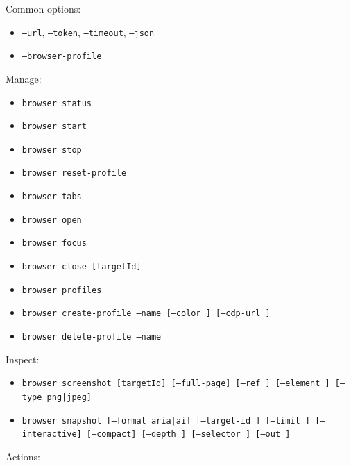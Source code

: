 Common options:

\begin{itemize}
  \item \texttt{--url}, \texttt{--token}, \texttt{--timeout}, \texttt{--json}
  \item \texttt{--browser-profile }
\end{itemize}


Manage:

\begin{itemize}
  \item \texttt{browser status}
  \item \texttt{browser start}
  \item \texttt{browser stop}
  \item \texttt{browser reset-profile}
  \item \texttt{browser tabs}
  \item \texttt{browser open }
  \item \texttt{browser focus }
  \item \texttt{browser close [targetId]}
  \item \texttt{browser profiles}
  \item \texttt{browser create-profile --name  [--color ] [--cdp-url ]}
  \item \texttt{browser delete-profile --name }
\end{itemize}


Inspect:

\begin{itemize}
  \item \texttt{browser screenshot [targetId] [--full-page] [--ref ] [--element ] [--type png|jpeg]}
  \item \texttt{browser snapshot [--format aria|ai] [--target-id ] [--limit ] [--interactive] [--compact] [--depth ] [--selector ] [--out ]}
\end{itemize}


Actions:

